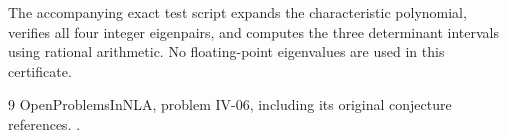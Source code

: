 The accompanying exact test script expands the characteristic polynomial, verifies all four integer eigenpairs, and computes the three determinant intervals using rational arithmetic. No floating-point eigenvalues are used in this certificate.
\begin{thebibliography}{9}
 OpenProblemsInNLA, problem IV-06, including its original conjecture references. .
\end{thebibliography}

